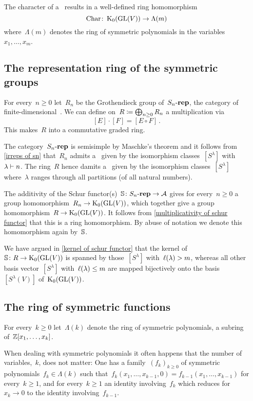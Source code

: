 \documentclass[a4paper,10pt]{scrartcl}
\begin{document}
The character of a~{} results in a well-defined ring homomorphism
\[
  \operatorname{Char}
  \colon
  \operatorname{K}_0(\operatorname{GL}(V))
  \to
  \Lambda(m)
\]
where~$\Lambda(m)$ denotes the ring of symmetric polynomials in the variables~$x_1, \dotsc, x_m$.


\subsection{The representation ring of the symmetric groups}

For every~$n \geq 0$ let~$R_n$ be the Grothendieck group of~$S_n\text{-}\mathbf{rep}$, the category of finite-dimensional~{}.
We can define on~$R \coloneqq \bigoplus_{n \geq 0} R_n$ a multiplication via
\[
  [E] \cdot [F]
  =
  [E \circ F] \,.
\]
This makes~$R$ into a commutative graded ring.

The category~$S_n\text{-}\mathbf{rep}$ is semisimple by Maschke’s theorem and it follows from \cref{irreps of sn} that~$R_n$ admits a~{\basis{$\Integer$}} given by the isomorphism classes~$[S^\lambda]$ with~$\lambda \vdash n$.
The ring~$R$ hence damits a~{\basis{$\Integer$}} given by the isomorphism classes~$[S^\lambda]$ where~$\lambda$ ranges through all partitions (of all natural numbers).

The additivity of the Schur functor(s)~$\mathbb{S} \colon S_n\text{-}\mathbf{rep} \to \mathcal{A}$ gives for every~$n \geq 0$ a group homomorphism~$R_n \to \operatorname{K}_0(\operatorname{GL}(V))$, which together give a group homomorphism~$R \to \operatorname{K}_0(\operatorname{GL}(V))$.
It follows from \cref{multiplicativity of schur functor} that this is a ring homomorphism.
By abuse of notation we denote this homomorphism again by~$\mathbb{S}$.

We have argued in \cref{kernel of schur functor} that the kernel of~$\mathbb{S} \colon R \to \operatorname{K}_0(\operatorname{GL}(V))$ is spanned by those~$[S^\lambda]$ with~$\operatorname{\ell}(\lambda) > m$, whereas all other basis vector~$[S^\lambda]$ with~$\operatorname{\ell}(\lambda) \leq m$ are mapped bijectively onto the basis~$[S^\lambda(V)]$ of~$\operatorname{K}_0(\operatorname{GL}(V))$.


\subsection{The ring of symmetric functions}

For every~$k \geq 0$ let~$\Lambda(k)$ denote the ring of symmetric polynomials, a subring of~$\mathbb{Z}[x_1, \dotsc, x_k]$.

When dealing with symmetric polynomials it often happens that the number of variables,~$k$, does not matter:
One has a family~$(f_k)_{k \geq 0}$ of symmetric polynomials~$f_k \in \Lambda(k)$ such that~$f_k(x_1, \dotsc, x_{k-1}, 0) = f_{k-1}(x_1, \dotsc, x_{k-1})$ for every~$k \geq 1$, and for every~$k \geq 1$ an identity involving~$f_k$ which reduces for~$x_k \to 0$ to the identity involving~$f_{k-1}$.
\end{document}
